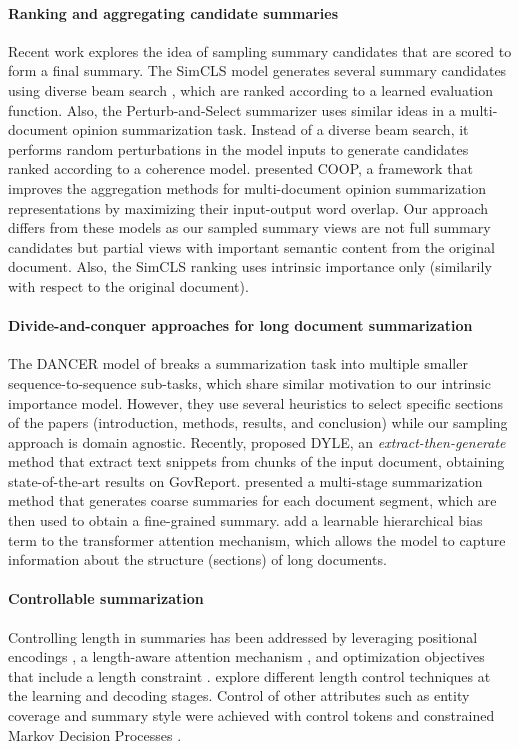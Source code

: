\documentclass[11pt,table]{article}
\begin{document}
\paragraph{Ranking and aggregating candidate summaries} Recent work explores the idea of sampling summary candidates that are scored to form a final summary. The SimCLS \citep{liu2021simcls} model generates several summary candidates using diverse beam search \citep{vijayakumar2016diverse}, which are ranked according to a learned evaluation function. Also, the Perturb-and-Select summarizer \citep{oved2021pass} uses similar ideas in a multi-document opinion summarization task. Instead of a diverse beam search, it performs random perturbations in the model inputs to generate candidates ranked according to a coherence model.  presented COOP, a framework that improves the aggregation methods for multi-document opinion summarization representations by maximizing their input-output word overlap. Our approach differs from these models as our sampled summary views are not full summary candidates but partial views with important semantic content from the original document. Also, the SimCLS ranking uses intrinsic importance only (similarily with respect to the original document).

\paragraph{Divide-and-conquer approaches for long document summarization} The DANCER model of  breaks a summarization task into multiple smaller sequence-to-sequence sub-tasks, which share similar motivation to our intrinsic importance model. However, they use several heuristics to select specific sections of the papers (introduction, methods, results, and conclusion) while our sampling approach is domain agnostic. Recently, \citet{mao_dyle_2022} proposed DYLE, an \emph{extract-then-generate} method that extract text snippets from chunks of the input document, obtaining state-of-the-art results on GovReport. \citet{zhang_summn_2022} presented a multi-stage summarization method that generates coarse summaries for each document segment, which are then used to obtain a fine-grained summary. \citet{cao_hibrids_2022} add a learnable hierarchical bias term to the transformer attention mechanism, which allows the model to capture information about the structure (sections) of long documents.

\paragraph{Controllable summarization} 
Controlling length in summaries has been addressed by leveraging positional encodings \citep{takase_positional_2019}, a length-aware attention mechanism \citep{liu_length_2022}, and optimization objectives that include a length constraint \citep{makino_global_2019}. \citet{kikuchi_controlling_2016} explore different length control techniques at the learning and decoding stages. Control of other attributes such as entity coverage and summary style were achieved with control tokens \citep{fan2017controllable, he_ctrlsum_2020} and constrained Markov Decision Processes \citep{chan_controllable_2021}.
\end{document}
